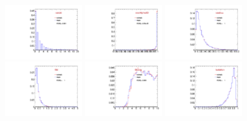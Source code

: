\begin{figure}
  \centering
  \includegraphics[width=0.3\textwidth]{Figures/VariablesComparison/MC_endcaps_figs/closetrk}
  \includegraphics[width=0.3\textwidth]{Figures/VariablesComparison/MC_endcaps_figs/cosa}
  \includegraphics[width=0.3\textwidth]{Figures/VariablesComparison/MC_endcaps_figs/docatrk}
  \includegraphics[width=0.3\textwidth]{Figures/VariablesComparison/MC_endcaps_figs/fl3d}
  \includegraphics[width=0.3\textwidth]{Figures/VariablesComparison/MC_endcaps_figs/fls3d}
  \includegraphics[width=0.3\textwidth]{Figures/VariablesComparison/MC_endcaps_figs/iso}

\end{figure}
